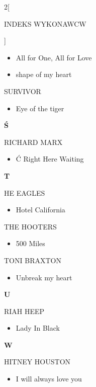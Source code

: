 \documentclass[a4paper]{report}
\begin{document}
\begin{multicols*}{2}[\begin{Huge}INDEKS WYKONAWCW\end{Huge}\vspace{1cm}]
\begin{itemize}[topsep=0pt]
\itemsep0em
\item[]  All for One, All for Love   \\
\item[]  shape of my heart   \\
\end{itemize}
 SURVIVOR 
\begin{itemize}[topsep=0pt]
\itemsep0em
\item[]  Eye of the tiger   \\
\end{itemize}
 \begin{Large}\textbf{Ś}\end{Large}RICHARD MARX 
\begin{itemize}[topsep=0pt]
\itemsep0em
\item[]  Ć Right Here Waiting   \\
\end{itemize}
 \begin{Large}\textbf{T}\end{Large}HE EAGLES 
\begin{itemize}[topsep=0pt]
\itemsep0em
\item[]  Hotel California   \\
\end{itemize}
 THE HOOTERS 
\begin{itemize}[topsep=0pt]
\itemsep0em
\item[]  500 Miles   \\
\end{itemize}
 TONI BRAXTON 
\begin{itemize}[topsep=0pt]
\itemsep0em
\item[]  Unbreak my heart   \\
\end{itemize}
 \begin{Large}\textbf{U}\end{Large}RIAH HEEP 
\begin{itemize}[topsep=0pt]
\itemsep0em
\item[]  Lady In Black   \\
\end{itemize}
 \begin{Large}\textbf{W}\end{Large}HITNEY HOUSTON 
\begin{itemize}[topsep=0pt]
\itemsep0em
\item[]  I will always love you   \\
\end{itemize}



\end{multicols*}
\end{document}
